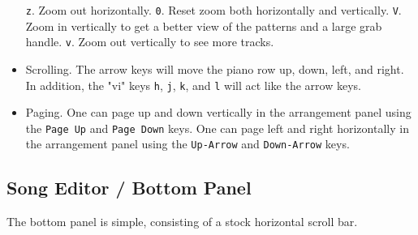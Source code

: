 \begin{itemize}
         \texttt{z}. Zoom out horizontally.
         \texttt{0}. Reset zoom both horizontally and vertically.
         \texttt{V}. Zoom in vertically to get a better view of the patterns
            and a large grab handle.
         \texttt{v}. Zoom out vertically to see more tracks.
      \item Scrolling.
         The arrow keys will move the piano row up, down, left, and right.
         In addition, the "vi" keys \texttt{h}, \texttt{j}, \texttt{k}, and
         \texttt{l} will act like the arrow keys.
      \item Paging.
      One can page up and down vertically in the arrangement
      panel using the
      \texttt{Page Up} and 
      \texttt{Page Down} keys.
      One can page left and right horizontally in the arrangement
      panel using the
       \texttt{Up-Arrow} and 
       \texttt{Down-Arrow} keys.
   \end{itemize}

\subsection{Song Editor / Bottom Panel}
\label{subsec:song_editor_bottom}

   The bottom panel is simple, consisting of a stock horizontal scroll bar.

\begin{comment}

   and a small button, called the \textbf{Grow} button, labelled with a
   "\textbf{$>$}".

   \index{grow button}
   \index{song editor!grow}
   The \textbf{Grow} button adds to the number of measures that exist
   in the song editor. The visual effect is very subtle, resulting only
   in a small change in the thumb of the horizontal scroll-bar, unless one
   is at the right end of the piano roll.  Then, one can see the added
   measures.  Usually about 128 at a time are added, but this depends on the
   value of PPQN in force.

\end{comment}

